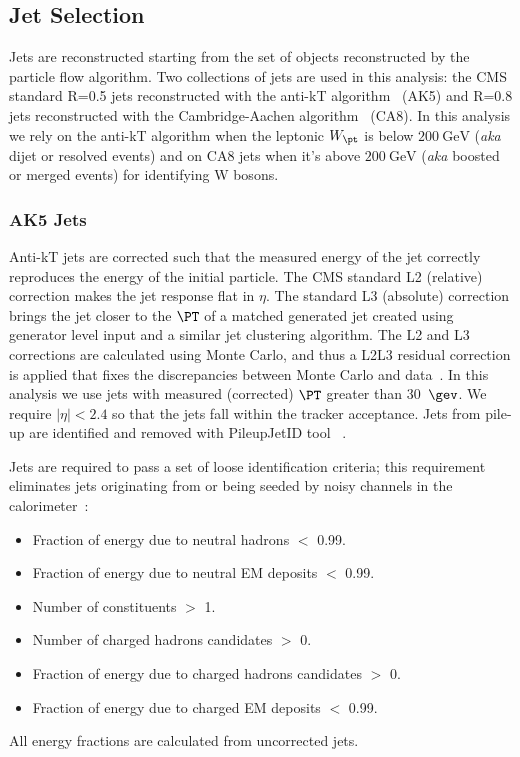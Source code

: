 \subsection{Jet Selection}
\label{sec:firstStep_jets}

Jets are reconstructed starting from the set of objects reconstructed by the particle flow algorithm\cite{pflow,CMS-PAS-JME-10-003,CMS-PAS-PFT-10-002}.
Two collections of jets are used in this analysis: the CMS standard R=0.5 
jets reconstructed with the anti-kT algorithm~\cite{cacciari} (AK5) and R=0.8 jets reconstructed with the
Cambridge-Aachen algorithm~\cite{Dokshitzer:1997in} (CA8). In this analysis we rely on the anti-kT algorithm when the leptonic $W_{\pt}$ is below $200~\mathrm{GeV}$ ({\it aka} dijet or resolved events) and on CA8 jets when it's above $200~\mathrm{GeV}$ ({\it aka} boosted or merged events) for identifying W bosons.

\subsubsection{AK5 Jets}
Anti-kT jets are corrected such that the measured energy of the jet 
correctly reproduces the energy of the initial particle. 
The CMS standard L2 (relative) correction makes the jet response flat in $\eta$.
The standard L3 (absolute) correction brings the jet closer to the $\PT$ of 
a matched generated jet created using generator level input and a similar 
jet clustering algorithm.
The L2 and L3 corrections are calculated using Monte Carlo, and thus a 
L2L3 residual correction is applied that fixes the discrepancies between 
Monte Carlo and data~\cite{newjes-cms}.
In this analysis we use jets with measured (corrected) $\PT$  
greater than 30~$\gev$. 
We require $|\eta| < 2.4$ so that the jets fall within the
tracker acceptance.  Jets from pile-up are identified and removed with PileupJetID tool ~\cite{cite:PileupJetID}.

Jets are required to pass a set of loose identification
criteria; this requirement eliminates jets originating from or being seeded by
noisy channels in the calorimeter~\cite{Chatrchyan:2009hy}: 

\begin{itemize}
\item Fraction of energy due to neutral hadrons $<$ 0.99.
\item Fraction of energy due to neutral EM deposits $<$ 0.99.
\item Number of constituents $>$ 1.
\item Number of charged hadrons candidates $>$ 0.
\item Fraction of energy due to charged hadrons candidates $>$ 0.
\item Fraction of energy due to charged EM deposits $<$ 0.99.
\end{itemize}
All energy fractions are calculated from uncorrected jets.

